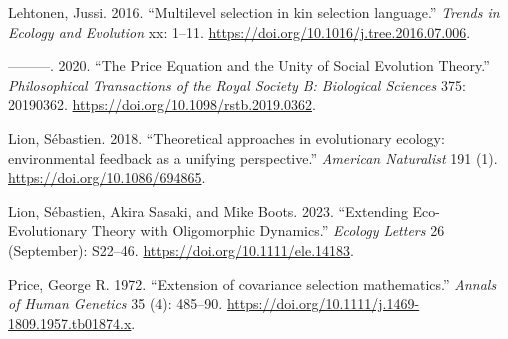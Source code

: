 \documentclass[
]{article}
\newlength{\cslhangindent}
\newenvironment{CSLReferences}[2] %
 {\begin{list}{}{%
  \setlength{\itemindent}{0pt}
  \setlength{\leftmargin}{0pt}
  \setlength{\parsep}{0pt}
  \ifodd #1
   \setlength{\leftmargin}{\cslhangindent}
   \setlength{\itemindent}{-1\cslhangindent}
  \fi
  \setlength{\itemsep}{#2\baselineskip}}}
 {\end{list}}
\begin{document}
\begin{CSLReferences}{1}{0}
Lehtonen, Jussi. 2016. {``{Multilevel selection in kin selection
language}.''} \emph{Trends in Ecology and Evolution} xx: 1--11.
\url{https://doi.org/10.1016/j.tree.2016.07.006}.

---------. 2020. {``The Price Equation and the Unity of Social Evolution
Theory.''} \emph{Philosophical Transactions of the Royal Society B:
Biological Sciences} 375: 20190362.
\url{https://doi.org/10.1098/rstb.2019.0362}.

Lion, Sébastien. 2018. {``{Theoretical approaches in evolutionary
ecology: environmental feedback as a unifying perspective}.''}
\emph{American Naturalist} 191 (1).
\url{https://doi.org/10.1086/694865}.

Lion, Sébastien, Akira Sasaki, and Mike Boots. 2023. {``Extending
Eco-Evolutionary Theory with Oligomorphic Dynamics.''} \emph{Ecology
Letters} 26 (September): S22--46.
\url{https://doi.org/10.1111/ele.14183}.

Price, George R. 1972. {``{Extension of covariance selection
mathematics}.''} \emph{Annals of Human Genetics} 35 (4): 485--90.
\url{https://doi.org/10.1111/j.1469-1809.1957.tb01874.x}.

\end{CSLReferences}
\end{document}
